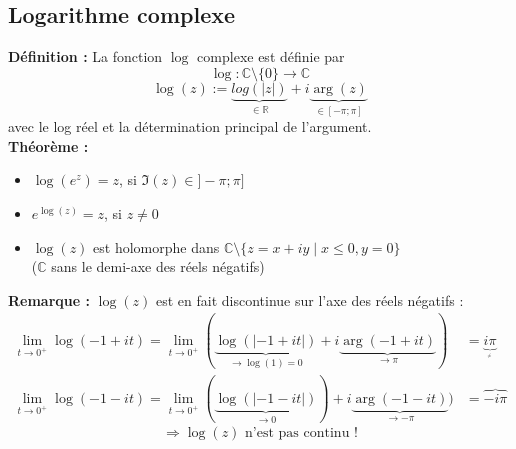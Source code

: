 \subsection{Logarithme complexe}
\textbf{Définition :}
La fonction $\log$ complexe est définie par
$$\log : \mathbb{C}\setminus\{0\}\to\mathbb{C}$$
$$\log(z) := \underbrace{log(|z|)}_{\in\mathbb{R}} + i\underbrace{\arg(z)}_{\in[-\pi;\pi]}$$
avec le log réel et la détermination principal de l'argument. \\
\textbf{Théorème :}
\begin{itemize}
    \item $\log(e^z) = z$, si $\Im(z) \in ]-\pi;\pi]$ 
    \item $e^{\log(z)} = z$, si $z\neq 0$
    \item $\log(z)$ est holomorphe dans $\mathbb{C}\setminus\{z=x+iy\mid x \leq 0, y=0\}$ \\
    ($\mathbb{C}$ sans le demi-axe des réels négatifs)
\end{itemize}
\textbf{Remarque :} $\log(z)$ est en fait discontinue sur l'axe des réels négatifs :
\begin{align*}
    \lim_{t \to 0^+}\log(-1+it) = \lim_{t \to 0^+}(\underbrace{\log(|-1+it|)}_{\to \log(1)=0} + i\underbrace{\arg(-1+it)}_{\to \pi}) &= \underbrace{i\pi}_{_{_{\neq}}} \\
    \lim_{t\to 0^+}\log(-1-it) = \lim_{t \to 0^+}(\underbrace{\log(|-1-it|)}_{\to 0}) + i\underbrace{\arg(-1-it)}_{\to -\pi}) &= \overbrace{-i\pi}
\end{align*}
$$\Rightarrow \log(z)\text{ n'est pas continu !}$$